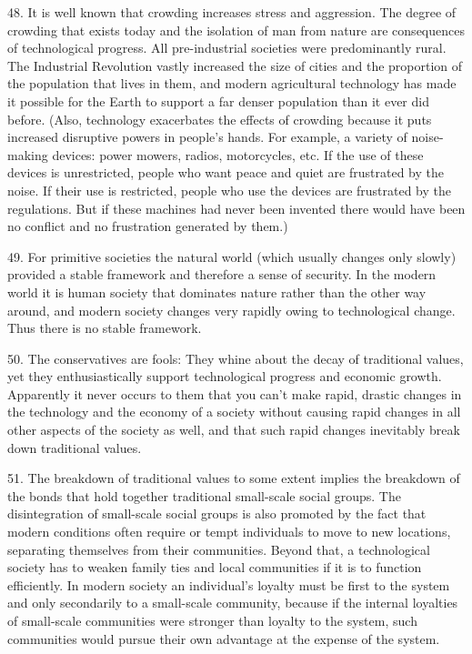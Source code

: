 \documentclass{article}
\begin{document}
48.  It is well known that crowding increases stress and aggression.  The degree of crowding that 
exists today and the isolation of man from nature are consequences of technological progress.  All 
pre-industrial societies were predominantly rural.  The Industrial Revolution vastly increased the 
size  of  cities  and  the  proportion  of  the  population  that  lives  in  them,  and  modern  agricultural  
technology has made it possible for the Earth to support a far denser population than it ever did 
before.  (Also, technology exacerbates the effects of crowding because it puts increased disruptive 
powers in people’s hands.  For example, a variety of noise-making devices: power mowers, radios, 
motorcycles, etc.  If the use of these devices is unrestricted, people who want peace and quiet are 
frustrated by the noise.  If their use is restricted, people who use the devices are frustrated by the 
regulations.  But if these machines had never been invented there would have been no conflict and 
no frustration generated by them.) \vspace{\baselineskip}

49.  For  primitive  societies  the  natural  world  (which  usually  changes  only  slowly)  provided  a  
stable framework and therefore a sense of security.  In the modern world it is human society that 
dominates nature rather than the other way around, and modern society changes very rapidly owing 
to technological change.  Thus there is no stable framework. \vspace{\baselineskip}
 
50.  The  conservatives  are  fools:  They  whine  about  the  decay  of  traditional  values,  yet  they  
enthusiastically support technological progress and economic growth.  Apparently it never occurs 
to them that you can’t make rapid, drastic changes in the technology and the economy of a society 
without  causing  rapid  changes  in  all  other  aspects  of  the  society  as  well,  and  that  such  rapid  
changes inevitably break down traditional values. \vspace{\baselineskip}

51.  The breakdown of traditional values to some extent implies the breakdown of the bonds that 
hold together traditional small-scale social groups.  The disintegration of small-scale social groups 
is also promoted by the fact that modern conditions often require or tempt individuals to move to 
new  locations,  separating  themselves  from  their  communities.   Beyond  that,  a  technological  
society has to weaken family ties and local communities if it is to function efficiently.  In modern 
society  an individual’s loyalty must be first to the system and only secondarily to a small-scale 
community, because if the internal loyalties of small-scale communities were stronger than loyalty 
to the system, such communities would pursue their own advantage at the expense of the system. \vspace{\baselineskip}
\end{document}
